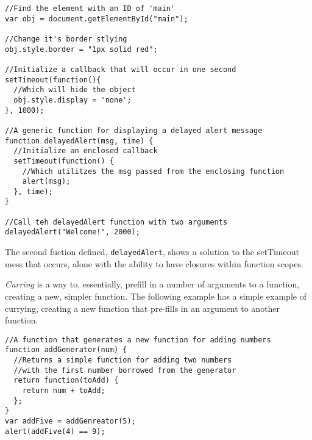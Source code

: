 \documentclass[a4paper,11pt]{book}
\begin{document}
\begin{verbatim}
//Find the element with an ID of 'main'
var obj = document.getElementById("main");

//Change it's border stlying
obj.style.border = "1px solid red";

//Initialize a callback that will occur in one second
setTimeout(function(){
  //Which will hide the object
  obj.style.display = 'none';
}, 1000);

//A generic function for displaying a delayed alert message
function delayedAlert(msg, time) {
  //Initialize an enclosed callback
  setTimeout(function() {
    //Which utilitzes the msg passed from the enclosing function
    alert(msg);
  }, time);
}

//Call teh delayedAlert function with two arguments
delayedAlert("Welcome!", 2000);
\end{verbatim}
The second fuction defined, \verb|delayedAlert|, shows a solution to the
setTimeout mess that occurs, alone with the ability to have closures within
function scopes.

\emph{Curring} is a way to, essentially, prefill in a number of arguments to a
function, creating a new, simpler function. The following example has a simple
example of currying, creating a new function that pre-fills in an argument to
another function.
\begin{verbatim}
//A function that generates a new function for adding numbers
function addGenerator(num) {
  //Returns a simple function for adding two numbers 
  //with the first number borrowed from the generator
  return function(toAdd) {
    return num + toAdd;
  };
}
var addFive = addGenreator(5);
alert(addFive(4) == 9);
\end{verbatim}
\end{document}
